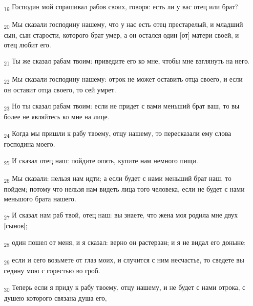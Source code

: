 \begin{tcolorbox}
\textsubscript{19} Господин мой спрашивал рабов своих, говоря: есть ли у вас отец или брат?
\end{tcolorbox}
\begin{tcolorbox}
\textsubscript{20} Мы сказали господину нашему, что у нас есть отец престарелый, и младший сын, сын старости, которого брат умер, а он остался один [от] матери своей, и отец любит его.
\end{tcolorbox}
\begin{tcolorbox}
\textsubscript{21} Ты же сказал рабам твоим: приведите его ко мне, чтобы мне взглянуть на него.
\end{tcolorbox}
\begin{tcolorbox}
\textsubscript{22} Мы сказали господину нашему: отрок не может оставить отца своего, и если он оставит отца своего, то сей умрет.
\end{tcolorbox}
\begin{tcolorbox}
\textsubscript{23} Но ты сказал рабам твоим: если не придет с вами меньший брат ваш, то вы более не являйтесь ко мне на лице.
\end{tcolorbox}
\begin{tcolorbox}
\textsubscript{24} Когда мы пришли к рабу твоему, отцу нашему, то пересказали ему слова господина моего.
\end{tcolorbox}
\begin{tcolorbox}
\textsubscript{25} И сказал отец наш: пойдите опять, купите нам немного пищи.
\end{tcolorbox}
\begin{tcolorbox}
\textsubscript{26} Мы сказали: нельзя нам идти; а если будет с нами меньший брат наш, то пойдем; потому что нельзя нам видеть лица того человека, если не будет с нами меньшого брата нашего.
\end{tcolorbox}
\begin{tcolorbox}
\textsubscript{27} И сказал нам раб твой, отец наш: вы знаете, что жена моя родила мне двух [сынов];
\end{tcolorbox}
\begin{tcolorbox}
\textsubscript{28} один пошел от меня, и я сказал: верно он растерзан; и я не видал его доныне;
\end{tcolorbox}
\begin{tcolorbox}
\textsubscript{29} если и сего возьмете от глаз моих, и случится с ним несчастье, то сведете вы седину мою с горестью во гроб.
\end{tcolorbox}
\begin{tcolorbox}
\textsubscript{30} Теперь если я приду к рабу твоему, отцу нашему, и не будет с нами отрока, с душею которого связана душа его,
\end{tcolorbox}
